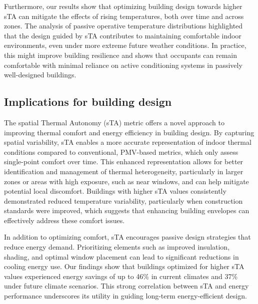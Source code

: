 Furthermore, our results show that optimizing building design towards higher sTA can mitigate the effects of rising temperatures, both over time and across zones. The analysis of passive operative temperature distributions highlighted that the design guided by sTA contributes to maintaining comfortable indoor environments, even under more extreme future weather conditions. In practice, this might improve building resilience and shows that occupants can remain comfortable with minimal reliance on active conditioning systems in passively well-designed buildings.






\subsection{Implications for building design}


The spatial Thermal Autonomy (sTA) metric offers a novel approach to improving thermal comfort and energy efficiency in building design. By capturing spatial variability, sTA enables a more accurate representation of indoor thermal conditions compared to conventional, PMV-based metrics, which only assess single-point comfort over time. This enhanced representation allows for better identification and management of thermal heterogeneity, particularly in larger zones or areas with high exposure, such as near windows, and can help mitigate potential local discomfort. Buildings with higher sTA values consistently demonstrated reduced temperature variability, particularly when construction standards were improved, which suggests that enhancing building envelopes can effectively address these comfort issues.

In addition to optimizing comfort, sTA encourages passive design strategies that reduce energy demand. Prioritizing elements such as improved insulation, shading, and optimal window placement can lead to significant reductions in cooling energy use. Our findings show that buildings optimized for higher sTA values experienced energy savings of up to 46\% in current climates and 37\% under future climate scenarios. This strong correlation between sTA and energy performance underscores its utility in guiding long-term energy-efficient design.

